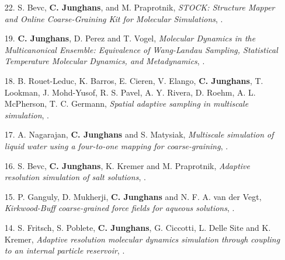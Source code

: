 \documentclass{article}
\begin{document}
\begin{enumerate}
\item[22.] S. Bevc, \textbf{C. Junghans}, and M. Praprotnik,
  \textit{STOCK: Structure Mapper and Online Coarse-Graining Kit for Molecular Simulations},
  .

\item[19.] \textbf{C. Junghans}, D. Perez and T. Vogel,
  \textit{Molecular Dynamics in the Multicanonical Ensemble: Equivalence of Wang-Landau Sampling, Statistical Temperature Molecular Dynamics, and Metadynamics},
  .

\item[18.] B. Rouet-Leduc, K. Barros, E. Cieren, V. Elango, \textbf{C. Junghans}, T. Lookman, J. Mohd-Yusof, R. S. Pavel, A. Y. Rivera, D. Roehm, A. L. McPherson, T. C. Germann,
  \textit{Spatial adaptive sampling in multiscale simulation},
  .

\item[17.] A. Nagarajan, \textbf{C. Junghans} and S. Matysiak,
  \textit{Multiscale simulation of liquid water using a four-to-one mapping for coarse-graining},
  .

\item[16.] S. Bevc, \textbf{C. Junghans}, K. Kremer and M. Praprotnik,
  \textit{Adaptive resolution simulation of salt solutions},
  .

\item[15.] P. Ganguly, D. Mukherji, \textbf{C. Junghans} and N. F. A. van der Vegt,
  \textit{Kirkwood-Buff coarse-grained force fields for aqueous solutions},
  .

\item[14.] S. Fritsch, S. Poblete, \textbf{C. Junghans}, G. Ciccotti, L. Delle Site and K. Kremer,
  \textit{Adaptive resolution molecular dynamics simulation through coupling to an internal particle reservoir},
  .


\end{enumerate}
\end{document}
